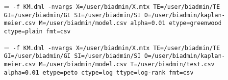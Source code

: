 \smallskip
{}
\smallskip

{\hangindent=\parindent\noindent\tt
	\hml -f KM.dml -nvargs X=/user/biadmin/X.mtx TE=/user/biadmin/TE
	GI=/user/biadmin/GI SI=/user/biadmin/SI O=/user/biadmin/kaplan-meier.csv
	M=/user/biadmin/model.csv alpha=0.01 etype=greenwood ctype=plain fmt=csv
	
}\smallskip

{\hangindent=\parindent\noindent\tt
	\hml -f KM.dml -nvargs X=/user/biadmin/X.mtx TE=/user/biadmin/TE
	GI=/user/biadmin/GI SI=/user/biadmin/SI O=/user/biadmin/kaplan-meier.csv
	M=/user/biadmin/model.csv T=/user/biadmin/test.csv alpha=0.01 etype=peto 
	ctype=log ttype=log-rank fmt=csv
	
}

%

